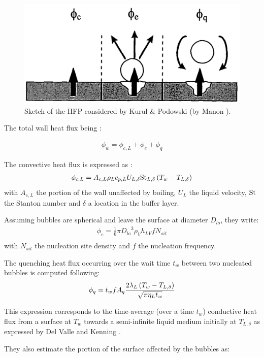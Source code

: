 \begin{figure}[!h]
\centering
\includegraphics[width=0.6\linewidth]{img/HFP/KP/KP_hfp.PNG}
\caption{Sketch of the HFP considered by Kurul \& Podowski (by Manon \cite{manon_contribution_2000}).}
\label{fig:KP_hfp}
\end{figure}

The total wall heat flux being :

\begin{align}
\phi_{w}=\phi_{c,L}+\phi_{e}+\phi_{q}
\end{align}

The convective heat flux is expressed as :
\begin{align}
\phi_{c,L}=A_{c,L} \rho_{L} c_{p,L}U_{L,\delta} \mathrm{St}_{L,\delta}\left( T_{w}-T_{L,\delta} \right)
\label{eq:KP_hfp_phicL}
\end{align}
with $A_{c,L}$ the portion of the wall unaffected by boiling, $U_{L}$ the liquid velocity, $\mathrm{St}$ the Stanton number and $\delta$ a location in the buffer layer.

\npar
Assuming bubbles are spherical and leave the surface at diameter $D_{lo}$, they write:
\begin{align}
\phi_{e}=\frac{1}{6}\pi {D_{lo}}^{3}\rho_{V}h_{LV}fN_{sit}\\
\label{eq:KP_hfp_phie}
\end{align}
with $N_{sit}$ the nucleation site density and $f$ the nucleation frequency.

\npar
The quenching heat flux occurring over the wait time $t_{w}$ between two nucleated bubbles is computed following:  
\begin{align}
\phi_{q}=t_{w}fA_{q}\frac{2\lambda_{L}\left( T_{w}-T_{L,\delta} \right)}{\sqrt{\pi \eta_{L} t_{w}}}
\label{eq:KP_hfp_phiq}
\end{align}

This expression corresponds to the time-average (over a time $t_{w}$) conductive heat flux from a surface at $T_{w}$ towards a semi-infinite liquid medium initially at $T_{L,\delta}$ as expressed by Del Valle and Kenning \cite{del_valle_subcooled_1985}.

\npar
They also estimate the portion of the surface affected by the bubbles as:

